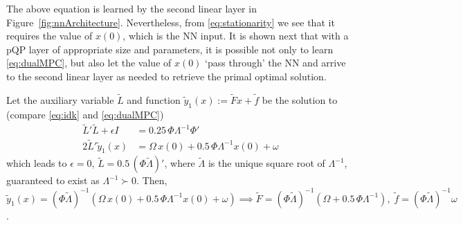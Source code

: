 The above equation is learned by the second linear layer in Figure~\ref{fig:nnArchitecture}. Nevertheless, from \eqref{eq:stationarity} we see that it requires the value of $x(0)$, which is the NN input. It is shown next that with a pQP layer of appropriate size and parameters, it is possible not only to learn \eqref{eq:dualMPC}, but also let the value of $x(0)$ `pass through' the NN and arrive to the second linear layer as needed to retrieve the primal optimal solution.

Let the auxiliary variable $\tilde{L}$ and function $\tilde{y}_1(x) := \tilde{F}x + \tilde{f}$ be the solution to (compare \eqref{eq:idk} and \eqref{eq:dualMPC})
\begin{subequations}
	\label{eq:Landg1}
	\begin{align}
		\tilde{L}'\tilde{L} + \epsilon I & = 0.25 \, \Phi \Lambda^{-1} \Phi' \\
		2 \tilde{L}'\tilde{y}_1(x) & = \Omega \, x(0) + 0.5 \, \Phi \Lambda^{-1}x(0) + \omega %
	\end{align}
\end{subequations}
which leads to $\epsilon = 0$, $\tilde{L} = 0.5 \, (\Phi \tilde{\Lambda})'$, where $\tilde{\Lambda}$ is the unique square root of $\Lambda^{-1}$, guaranteed to exist as $\Lambda^{-1} \succ 0$. Then, $\tilde{y}_1(x) = (\Phi \tilde{\Lambda})^{-1} (\Omega \, x(0) + 0.5 \, \Phi \Lambda^{-1} x(0) + \omega) \implies \tilde{F} = (\Phi\tilde{\Lambda})^{-1}(\Omega+0.5 \, \Phi \Lambda^{-1}), \; \tilde{f} = (\Phi\tilde{\Lambda})^{-1}\omega$. 

